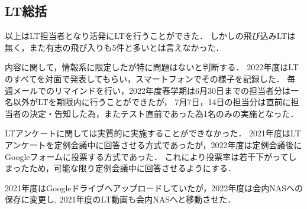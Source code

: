 \subsection*{LT総括}


\secondGrade{}以上はLT担当者となり活発にLTを行うことができた．
しかし\firstGrade{}の飛び込みLTは無く，また有志の飛び入りも5件と多いとは言えなかった．

内容に関して，情報系に限定したが特に問題はないと判断する．
2022年度はLTのすべてを対面で発表してもらい，スマートフォンでその様子を記録した．
毎週メールでのリマインドを行い，2022年度春学期は6月30日までの担当者分は一名以外がLTを期限内に行うことができたが，
7月7日，14日の担当分は直前に担当者の決定・告知した為，またテスト直前であった為1名のみの実施となった．

LTアンケートに関しては実質的に実施することができなかった．
2021年度はLTアンケートを定例会議中に回答させる方式であったが，2022年度は定例会議後にGoogleフォームに投票する方式であった．
これにより投票率は若干下がってしまったため，可能な限り定例会議中に回答させるようにする．

2021年度はGoogleドライブへアップロードしていたが，2022年度は会内NASへの保存に変更し,
2021年度のLT動画も会内NASへと移動させた．
